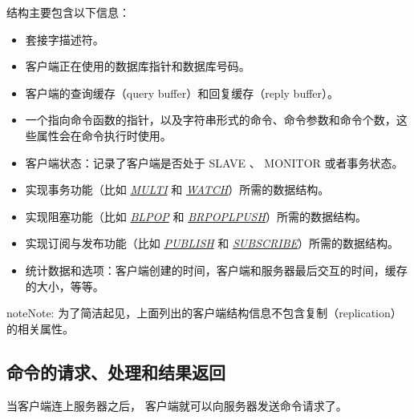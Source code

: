 \documentclass[a4paper,11pt,english]{sphinxmanual}
\begin{document}
 结构主要包含以下信息：
\begin{itemize}
\item {} 
套接字描述符。

\item {} 
客户端正在使用的数据库指针和数据库号码。

\item {} 
客户端的查询缓存（query buffer）和回复缓存（reply buffer）。

\item {} 
一个指向命令函数的指针，以及字符串形式的命令、命令参数和命令个数，这些属性会在命令执行时使用。

\item {} 
客户端状态：记录了客户端是否处于 SLAVE 、 MONITOR 或者事务状态。

\item {} 
实现事务功能（比如 \href{http://redis.readthedocs.org/en/latest/transaction/multi.html\#multi}{\emph{MULTI}} 和 \href{http://redis.readthedocs.org/en/latest/transaction/watch.html\#watch}{\emph{WATCH}}）所需的数据结构。

\item {} 
实现阻塞功能（比如 \href{http://redis.readthedocs.org/en/latest/list/blpop.html\#blpop}{\emph{BLPOP}} 和 \href{http://redis.readthedocs.org/en/latest/list/brpoplpush.html\#brpoplpush}{\emph{BRPOPLPUSH}}）所需的数据结构。

\item {} 
实现订阅与发布功能（比如 \href{http://redis.readthedocs.org/en/latest/pub\_sub/publish.html\#publish}{\emph{PUBLISH}} 和 \href{http://redis.readthedocs.org/en/latest/pub\_sub/subscribe.html\#subscribe}{\emph{SUBSCRIBE}}）所需的数据结构。

\item {} 
统计数据和选项：客户端创建的时间，客户端和服务器最后交互的时间，缓存的大小，等等。

\end{itemize}

\begin{notice}{note}{Note:}
为了简洁起见，上面列出的客户端结构信息不包含复制（replication）的相关属性。
\end{notice}


\subsection{命令的请求、处理和结果返回}
\label{internal/redis:id9}
当客户端连上服务器之后，
客户端就可以向服务器发送命令请求了。
\end{document}
